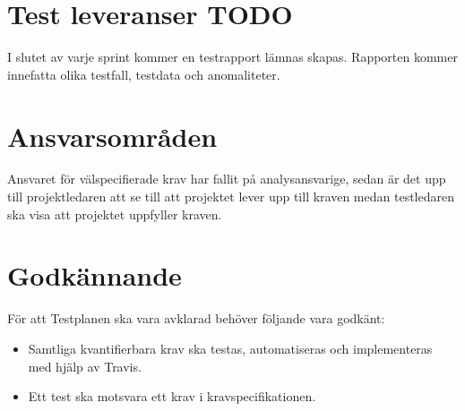 \documentclass[10pt]{article}
\begin{document}
\section{Test leveranser {\color{red}TODO}}
	I slutet av varje sprint kommer en testrapport lämnas skapas. Rapporten kommer innefatta olika testfall, testdata och anomaliteter.




\section{Ansvarsområden}
	Ansvaret för välspecifierade krav har fallit på analysansvarige, sedan är det upp till projektledaren att se till att projektet lever upp till kraven medan testledaren ska visa att projektet uppfyller kraven.

  

	
	
\section{Godkännande}
	För att Testplanen ska vara avklarad behöver följande vara godkänt:
	\begin{itemize}
	 \item Samtliga kvantifierbara krav ska testas, automatiseras och implementeras med hjälp av Travis.
	 \item Ett test ska motsvara ett krav i kravspecifikationen.
	\end{itemize}
	
\end{document}
